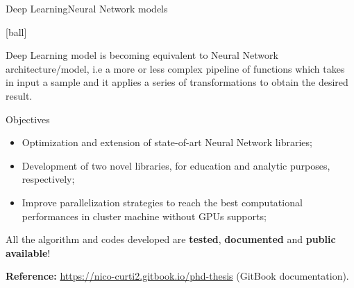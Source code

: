 \documentclass{standalone}
\begin{document}

\begin{frame}{Deep Learning}{Neural Network models}

  [ball]

  \scriptsize{Deep Learning model is becoming equivalent to Neural Network architecture/model, i.e a more or less complex pipeline of functions which takes in input a sample and it applies a series of transformations to obtain the desired result.}

  \begin{block}{Objectives}
    \begin{itemize}

      \item Optimization and extension of state-of-art Neural Network libraries;

      \item  Development of two novel libraries, for education and analytic purposes, respectively;

      \item Improve parallelization strategies to reach the best computational performances in cluster machine without GPUs supports;

    \end{itemize}

  \end{block}

  \begin{alertblock}{}
    All the algorithm and codes developed are \textbf{tested}, \textbf{documented} and \textbf{public available}!

    \quad

    \textbf{Reference:} \url{https://nico-curti2.gitbook.io/phd-thesis} (GitBook documentation).
  \end{alertblock}

\end{frame}


\end{document}
